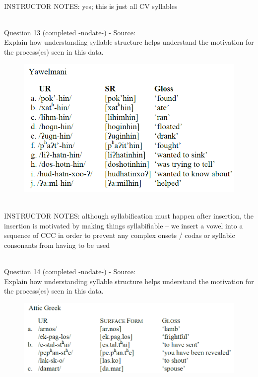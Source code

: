 \documentclass[12pt]{article}
\begin{document}
~\\
INSTRUCTOR NOTES: yes; this is just all CV syllables


~\\

{\large Question 13} (completed -nodate-) - Source: \\

Explain how understanding syllable structure helps understand the motivation for the process(es) seen in this data.\\

\begin{figure}[H]
\includegraphics{../images/yawelmani.png}
\end{figure}

~\\
INSTRUCTOR NOTES: although syllabification must happen after insertion, the insertion is motivated by making things syllabifiable -- we insert a vowel into a sequence of CCC in order to prevent any complex onsets / codas or syllabic consonants from having to be used


~\\

{\large Question 14} (completed -nodate-) - Source: \\

Explain how understanding syllable structure helps understand the motivation for the process(es) seen in this data.\\

\begin{figure}[H]
\includegraphics{../images/atticgreek.png}
\end{figure}
\end{document}
